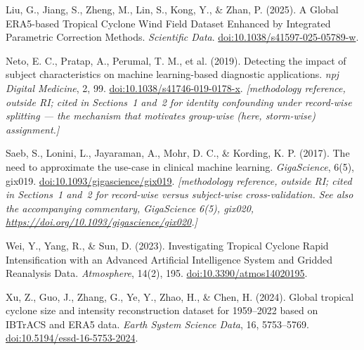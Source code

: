 \documentclass[11pt]{article}
\begin{document}
\begin{references}
\item Liu, G., Jiang, S., Zheng, M., Lin, S., Kong, Y., \& Zhan, P. (2025). A
Global ERA5-based Tropical Cyclone Wind Field Dataset Enhanced by Integrated
Parametric Correction Methods. \emph{Scientific Data}.
\href{https://doi.org/10.1038/s41597-025-05789-w}%
{doi:10.1038/s41597-025-05789-w}.

\item Neto, E. C., Pratap, A., Perumal, T. M., et al. (2019). Detecting the
impact of subject characteristics on machine learning-based diagnostic
applications. \emph{npj Digital Medicine}, 2, 99.
\href{https://doi.org/10.1038/s41746-019-0178-x}{doi:10.1038/s41746-019-0178-x}.
\emph{[methodology reference, outside RI; cited in Sections~1 and~2 for
identity confounding under record-wise splitting --- the mechanism that
motivates group-wise (here, storm-wise) assignment.]}

\item Saeb, S., Lonini, L., Jayaraman, A., Mohr, D. C., \& Kording, K. P.
(2017). The need to approximate the use-case in clinical machine learning.
\emph{GigaScience}, 6(5), gix019.
\href{https://doi.org/10.1093/gigascience/gix019}%
{doi:10.1093/gigascience/gix019}.
\emph{[methodology reference, outside RI; cited in Sections~1 and~2 for
record-wise versus subject-wise cross-validation. See also the accompanying
commentary, \emph{GigaScience} 6(5), gix020,
\url{https://doi.org/10.1093/gigascience/gix020}.]}

\item Wei, Y., Yang, R., \& Sun, D. (2023). Investigating Tropical Cyclone
Rapid Intensification with an Advanced Artificial Intelligence System and
Gridded Reanalysis Data. \emph{Atmosphere}, 14(2), 195.
\href{https://doi.org/10.3390/atmos14020195}{doi:10.3390/atmos14020195}.

\item Xu, Z., Guo, J., Zhang, G., Ye, Y., Zhao, H., \& Chen, H. (2024). Global
tropical cyclone size and intensity reconstruction dataset for 1959--2022
based on IBTrACS and ERA5 data. \emph{Earth System Science Data}, 16,
5753--5769.
\href{https://doi.org/10.5194/essd-16-5753-2024}%
{doi:10.5194/essd-16-5753-2024}.

\end{references}
\end{document}
